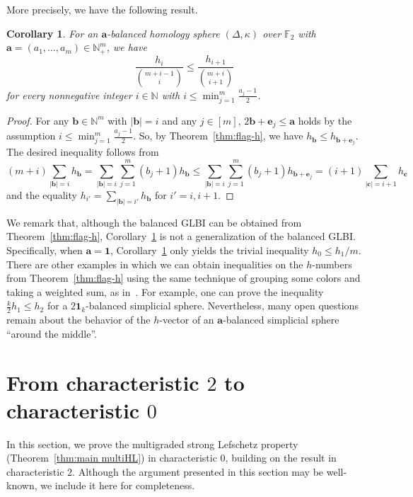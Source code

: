 \documentclass[11pt]{article}
\newtheorem{coro}[theo]{Corollary}
\theoremstyle{definition}
\numberwithin{equation}{section}
\begin{document}
More precisely, we have the following result.
\begin{coro} \label{cor:h-vec}
For an $\bm{a}$-balanced homology sphere $(\Delta,\kappa)$ over $\mathbb{F}_2$ with $\bm{a}=(a_1,\ldots,a_m) \in \mathbb{N}^m_+$, we have
\[
\frac{h_i}{\binom{m+i-1}{i}} \leq \frac{h_{i+1}}{\binom{m+i}{i+1}}
\]
for every nonnegative integer $i \in \mathbb{N}$ with $i \leq \min_{j=1}^m \frac{a_j-1}{2}$.
\end{coro}
\begin{proof}[Proof]
For any $\bm{b} \in \mathbb{N}^m$ with $|\bm{b}|=i$ and any $j \in[m]$, $2\bm{b}+\bm{e}_j \leq \bm{a}$ holds by the assumption $i \leq \min_{j=1}^m \frac{a_j-1}{2}$.
So, by Theorem~\ref{thm:flag-h}, we have $h_{\bm{b}} \leq h_{\bm{b}+\bm{e}_j}$.
The desired inequality follows from
\[
(m+i)\sum_{|\bm{b}|=i}h_{\bm{b}} = \sum_{|\bm{b}|=i}\sum_{j=1}^m (b_j+1) h_{\bm{b}} \leq \sum_{|\bm{b}|=i}\sum_{j=1}^m (b_j+1) h_{\bm{b}+\bm{e}_j} =(i+1)\sum_{|\bm{c}|=i+1}h_{\bm{c}}
\]
and the equality $h_{i'}=\sum_{|\bm{b}|=i'} h_{\bm{b}}$ for $i'=i,i+1$.
\end{proof}
We remark that, although the balanced GLBI can be obtained from Theorem~\ref{thm:flag-h}, Corollary~\ref{cor:h-vec} is not a generalization of the balanced GLBI. Specifically, when $\bm{a}=\bm{1}$, Corollary~\ref{cor:h-vec} only yields the trivial inequality $h_0 \leq h_1/m$.
There are other examples in which we can obtain inequalities on the $h$-numbers from Theorem~\ref{thm:flag-h} using the same technique of grouping some colors and taking a weighted sum, as in~\cite{JM,KN}. 
For example, one can prove the inequality $\frac{k}{2} h_1 \leq h_2$ for a $2\bm{1}_k$-balanced simplicial sphere.
Nevertheless, many open questions remain about the behavior of the $h$-vector of an $\bm{a}$-balanced simplicial sphere ``around the middle''.


\section{From characteristic \texorpdfstring{$2$}{2} to characteristic \texorpdfstring{$0$}{0}}
In this section, we prove the multigraded strong Lefschetz property (Theorem~\ref{thm:main multiHL}) in characteristic $0$, building on the result in characteristic $2$.
Although the argument presented in this section may be well-known, we include it here for completeness.
\end{document}
